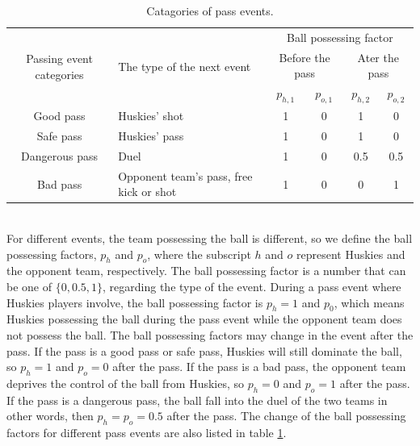 \documentclass[12pt]{article}
\begin{document}
\begin{itemize}
\begin{itemize}
\begin{table}[h]
			\caption{Catagories of pass events.}
			\label{Catagories of passing events}
			\begin{tabular}{cp{5cm}cccc}
			\toprule
			\multirow{3}{*}{Passing event categories} & \multirow{3}{*}{The type of the next event} & \multicolumn{4}{c}{Ball possessing factor}                               \\ \cline{3-6} 
													  &                                             & \multicolumn{2}{c}{Before the pass} & \multicolumn{2}{c}{Ater the pass} \\ \cline{3-6} 
													  &                                             & $p_{h,1}$             & $p_{o,1}$           & $p_{h,2}$            & $p_{o,2}$           \\ \midrule
			Good pass                                 & Huskies' shot                               & 1                 & 0               & 1                & 0               \\
			Safe pass                                 & Huskies' pass                               & 1                 & 0               & 1                & 0               \\
			Dangerous pass                            & Duel                                        & 1                 & 0               & 0.5              & 0.5             \\
			Bad pass                                  & Opponent team's pass, free kick or shot     & 1                 & 0               & 0                & 1              \\ \bottomrule
			\end{tabular}
		\end{table}
		\\For different events, the team possessing the ball is different, so we define the ball possessing factors, $p_h$ and $p_o$, where the subscript $h$ and $o$ represent Huskies and the opponent team, respectively. The ball possessing factor is a number that can be one of $\{0,0.5,1\}$, regarding the type of the event. During a pass event where Huskies players involve, the ball possessing factor is $p_h=1$ and $p_0$, which means Huskies possessing the ball during the pass event while the opponent team does not possess the ball. The ball possessing factors may change in the event after the pass. If the pass is a good pass or safe pass, Huskies will still dominate the ball, so $p_h=1$ and $p_o=0$ after the pass. If the pass is a bad pass, the opponent team deprives the control of the ball from Huskies, so $p_h=0$ and $p_o=1$ after the pass. If the pass is a dangerous pass, the ball fall into the duel of the two teams in other words, then $p_h=p_o=0.5$ after the pass. The change of the ball possessing factors for different pass events are also listed in table \ref{Catagories of passing events}.

\end{itemize}
\end{itemize}
\end{document}
